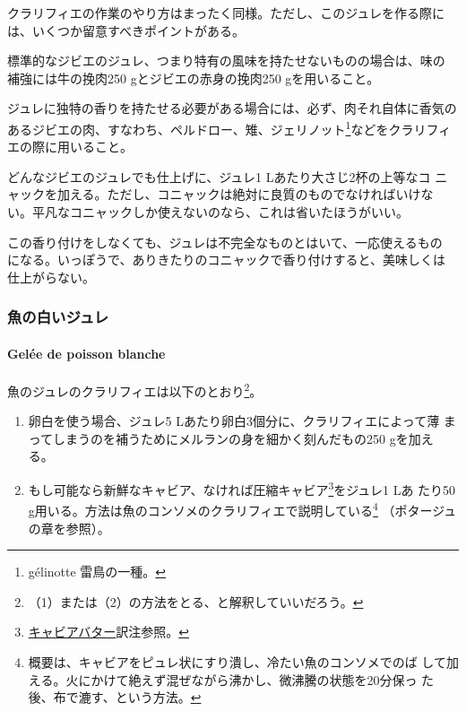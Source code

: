 \begin{recette}
クラリフィエの作業のやり方はまったく同様。ただし、このジュレを作る際に
は、いくつか留意すべきポイントがある。

標準的なジビエのジュレ、つまり特有の風味を持たせないものの場合は、味の
補強には牛の挽肉250 gとジビエの赤身の挽肉250 gを用いること。

ジュレに独特の香りを持たせる必要がある場合には、必ず、肉それ自体に香気のあるジビエの肉、すなわち、ペルドロー、雉、ジェリノット\footnote{gélinotte
  雷鳥の一種。}などをクラリフィエの際に用いること。

どんなジビエのジュレでも仕上げに、ジュレ1 Lあたり大さじ2杯の上等なコ
ニャックを加える。ただし、コニャックは絶対に良質のものでなければいけな
い。平凡なコニャックしか使えないのなら、これは省いたほうがいい。

この香り付けをしなくても、ジュレは不完全なものとはいて、一応使えるもの
になる。いっぽうで、ありきたりのコニャックで香り付けすると、美味しくは
仕上がらない。

\maeaki

\hypertarget{ux9b5aux306eux767dux3044ux30b8ux30e5ux30ec}{%
\subsubsection{魚の白いジュレ}\label{ux9b5aux306eux767dux3044ux30b8ux30e5ux30ec}}

\hypertarget{gelee-de-poisson-blanche}{%
\paragraph{Gelée de poisson blanche}\label{gelee-de-poisson-blanche}}


魚のジュレのクラリフィエは以下のとおり\footnote{（1）または（2）の方法をとる、と解釈していいだろう。}。

\begin{enumerate}
\def\labelenumi{\arabic{enumi}.}
\item
  卵白を使う場合、ジュレ5 Lあたり卵白3個分に、クラリフィエによって薄
  まってしまうのを補うためにメルランの身を細かく刻んだもの250 gを加え
  る。
\item
  もし可能なら新鮮なキャビア、なければ圧縮キャビア\footnote{\protect\hyperlink{beurre-de-caviar}{キャビアバター}訳注参照。}をジュレ1
  Lあ たり50
  g用いる。方法は魚のコンソメのクラリフィエで説明している\footnote{概要は、キャビアをピュレ状にすり潰し、冷たい魚のコンソメでのば
    して加える。火にかけて絶えず混ぜながら沸かし、微沸騰の状態を20分保っ
    た後、布で漉す、という方法。} （ポタージュの章を参照）。
\end{enumerate}


\end{recette}
